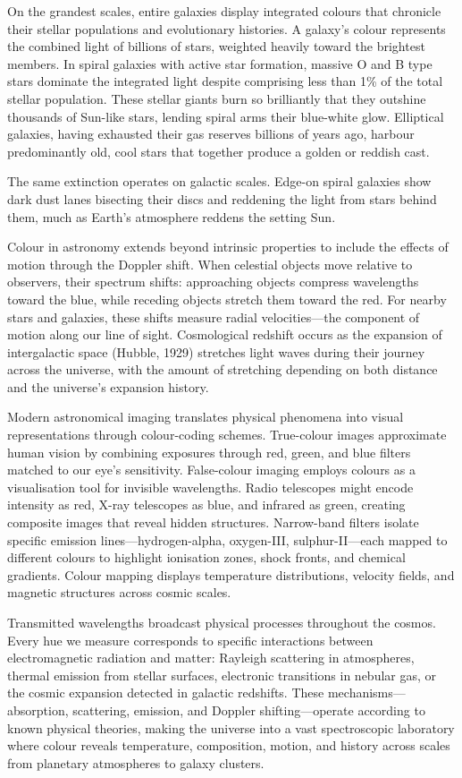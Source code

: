 On the grandest scales, entire galaxies display integrated colours that chronicle their stellar populations and evolutionary histories. A galaxy's colour represents the combined light of billions of stars, weighted heavily toward the brightest members. In spiral galaxies with active star formation, massive O and B type stars dominate the integrated light despite comprising less than 1\% of the total stellar population. These stellar giants burn so brilliantly that they outshine thousands of Sun-like stars, lending spiral arms their blue-white glow. Elliptical galaxies, having exhausted their gas reserves billions of years ago, harbour predominantly old, cool stars that together produce a golden or reddish cast.

The same extinction operates on galactic scales. Edge-on spiral galaxies show dark dust lanes bisecting their discs and reddening the light from stars behind them, much as Earth's atmosphere reddens the setting Sun.

Colour in astronomy extends beyond intrinsic properties to include the effects of motion through the Doppler shift. When celestial objects move relative to observers, their spectrum shifts: approaching objects compress wavelengths toward the blue, while receding objects stretch them toward the red. For nearby stars and galaxies, these shifts measure radial velocities—the component of motion along our line of sight. Cosmological redshift occurs as the expansion of intergalactic space (Hubble, 1929) stretches light waves during their journey across the universe, with the amount of stretching depending on both distance and the universe's expansion history.

Modern astronomical imaging translates physical phenomena into visual representations through colour-coding schemes. True-colour images approximate human vision by combining exposures through red, green, and blue filters matched to our eye's sensitivity. False-colour imaging employs colours as a visualisation tool for invisible wavelengths. Radio telescopes might encode intensity as red, X-ray telescopes as blue, and infrared as green, creating composite images that reveal hidden structures. Narrow-band filters isolate specific emission lines—hydrogen-alpha, oxygen-III, sulphur-II—each mapped to different colours to highlight ionisation zones, shock fronts, and chemical gradients. Colour mapping displays temperature distributions, velocity fields, and magnetic structures across cosmic scales.

Transmitted wavelengths broadcast physical processes throughout the cosmos. Every hue we measure corresponds to specific interactions between electromagnetic radiation and matter: Rayleigh scattering in atmospheres, thermal emission from stellar surfaces, electronic transitions in nebular gas, or the cosmic expansion detected in galactic redshifts. These mechanisms—absorption, scattering, emission, and Doppler shifting—operate according to known physical theories, making the universe into a vast spectroscopic laboratory where colour reveals temperature, composition, motion, and history across scales from planetary atmospheres to galaxy clusters.

